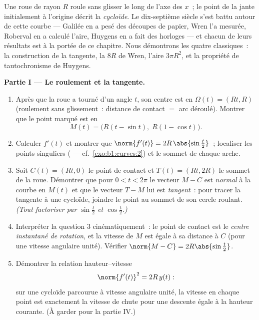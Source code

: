 \begin{problem}\label{pb:b1:curves:1}
Une roue de rayon $R$ roule sans glisser le long de l'axe des $x$~;
le point de la jante initialement à l'origine décrit la
\emph{cycloïde}. Le dix-septième siècle s'est battu autour de cette courbe
--- Galilée en a pesé des découpes de papier, Wren l'a mesurée,
Roberval en a calculé l'aire, Huygens en a fait des horloges --- et
chacun de leurs résultats est à la portée de ce chapitre. Nous
démontrons les quatre classiques~: la construction de la tangente, la 
$8R$ de Wren, l'aire $3\pi R^2$, et la propriété de tautochronisme
de Huygens.

\medskip
\noindent\textbf{Partie I --- Le roulement et la tangente.}
\begin{enumerate}
  \item Après que la roue a tourné d'un angle $t$, son centre
        est en $\Omega(t) = (Rt, R)$ (roulement sans glissement~:
        distance de contact $=$ arc déroulé). Montrer que le point
        marqué est en
        \[
        M(t) = \bigl(R(t - \sin t),\; R(1 - \cos t)\bigr).
        \]
  \item Calculer $f'(t)$ et montrer que $\norm{f'(t)} =
        2R\,\abs{\sin\frac t2}$~; localiser les points singuliers
        ( --- cf.\ \cref{exo:b1:curves:2}) et le sommet
        de chaque arche.
  \item Soit $C(t) = (Rt, 0)$ le point de contact et $T(t) =
        (Rt, 2R)$ le sommet de la roue. Démontrer que pour $0 < t <
        2\pi$ le vecteur $M - C$ est \emph{normal} à la courbe en
        $M(t)$ et que le vecteur $T - M$ lui est \emph{tangent}~: pour tracer
        la tangente à une cycloïde, joindre le point au sommet de
        son cercle roulant. \emph{(Tout factoriser par
        $\sin\frac t2$ et $\cos\frac t2$.)}
  \item Interpréter la question 3 cinématiquement~: le point de contact est
        le \emph{centre instantané de rotation}, et la
        vitesse de $M$ est égale à sa distance à $C$ (pour une vitesse
        angulaire unité). Vérifier $\norm{M - C} = 2R\abs{\sin\frac t2}$.
  \item Démontrer la relation hauteur--vitesse
        \[
        \norm{f'(t)}^2 = 2R\,y(t) :
        \]
        sur une cycloïde parcourue à vitesse angulaire unité, la
        vitesse en chaque point est exactement la vitesse de chute  pour une
        descente égale à la hauteur courante. (À garder pour
        la partie IV.)
\end{enumerate}


\end{problem}
